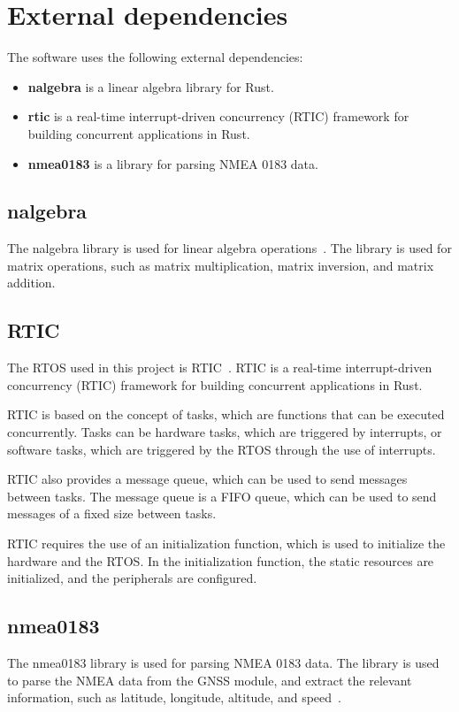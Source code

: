 \section{External dependencies}\label{sec:external-dependencies}
The software uses the following external dependencies:
\begin{itemize}
    \item \textbf{nalgebra} is a linear algebra library for Rust.
    \item \textbf{rtic} is a real-time interrupt-driven concurrency (RTIC) framework for building concurrent applications in Rust.
    \item \textbf{nmea0183} is a library for parsing NMEA 0183 data.
\end{itemize}
\subsection{nalgebra}
The nalgebra library is used for linear algebra operations~\cite{nalgebra}.
The library is used for matrix operations, such as matrix multiplication, matrix inversion, and matrix addition.

\subsection{RTIC}
The RTOS used in this project is RTIC~\cite{rtic}.
RTIC is a real-time interrupt-driven concurrency (RTIC) framework for building concurrent applications in Rust.

RTIC is based on the concept of tasks, which are functions that can be executed concurrently.
Tasks can be hardware tasks, which are triggered by interrupts, or software tasks, which are triggered by the RTOS through the use of interrupts.

RTIC also provides a message queue, which can be used to send messages between tasks.
The message queue is a FIFO queue, which can be used to send messages of a fixed size between tasks.

RTIC requires the use of an initialization function, which is used to initialize the hardware and the RTOS.
In the initialization function, the static resources are initialized, and the peripherals are configured.
\subsection{nmea0183}
The nmea0183 library is used for parsing NMEA 0183 data.
The library is used to parse the NMEA data from the GNSS module, and extract the relevant information, such as latitude, longitude, altitude, and speed~\cite{nema0183}.

